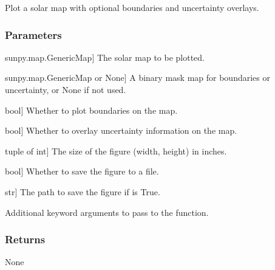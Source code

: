 \documentclass[letterpaper,10pt,english]{sphinxmanual}
\begin{document}
\begin{fulllineitems}
\label{\detokenize{pycatch/utils/plot:pycatch.utils.plot.plot_map}}
\pysigstartsignatures
{}
\pysigstopsignatures
\sphinxAtStartPar
Plot a solar map with optional boundaries and uncertainty overlays.


\subsubsection{Parameters}
\label{\detokenize{pycatch/utils/plot:id6}}\begin{description}
\sphinxlineitem{map}{[}sunpy.map.GenericMap{]}
\sphinxAtStartPar
The solar map to be plotted.

\sphinxlineitem{bmap}{[}sunpy.map.GenericMap or None{]}
\sphinxAtStartPar
A binary mask map for boundaries or uncertainty, or None if not used.

\sphinxlineitem{boundary}{[}bool{]}
\sphinxAtStartPar
Whether to plot boundaries on the map.

\sphinxlineitem{uncertainty}{[}bool{]}
\sphinxAtStartPar
Whether to overlay uncertainty information on the map.

\sphinxlineitem{fsize}{[}tuple of int{]}
\sphinxAtStartPar
The size of the figure (width, height) in inches.

\sphinxlineitem{save}{[}bool{]}
\sphinxAtStartPar
Whether to save the figure to a file.

\sphinxlineitem{spath}{[}str{]}
\sphinxAtStartPar
The path to save the figure if  is True.

\sphinxAtStartPar
Additional keyword arguments to pass to the  function.

\end{description}


\subsubsection{Returns}
\label{\detokenize{pycatch/utils/plot:id9}}
\sphinxAtStartPar
None

\end{fulllineitems}
\end{document}
